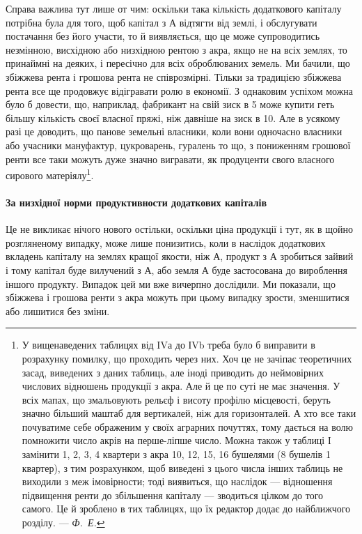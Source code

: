 Справа важлива тут лише от чим: оскільки така кількість додаткового
капіталу потрібна була для того, щоб капітал з $А$ відтягти від землі, і обслугувати
постачання без його участи, то й виявляється, що це може супроводитись
незмінною, висхідною або низхідною рентою з акра, якщо не на всіх землях, то
принаймні на деяких, і пересічно для всіх оброблюваних земель. Ми бачили, що
збіжжева рента і грошова рента не співрозмірні. Тільки за традицією збіжжева
рента все ще продовжує відігравати ролю в економії. З однаковим успіхом можна
було б довести, що, наприклад, фабрикант на свій зиск в 5 може купити
геть більшу кількість своєї власної пряжі, ніж давніше на зиск в 10.
Але в усякому разі це доводить, що панове земельні власники, коли вони одночасно
власники або учасники мануфактур, цукроварень, гуралень то що, з пониженням
грошової ренти все таки можуть дуже значно вигравати, як продуценти
свого власного сирового матеріялу\footnote{
У вищенаведених таблицях від IVа до ІVb треба було б виправити в розрахунку помилку, що
проходить через них. Хоч це не зачіпає теоретичних засад, виведених з даних таблиць, але іноді
приводить до неймовірних числових відношень продукції з акра. Але й це по суті не має значення. У
всіх мапах, що змальовують рельєф і висоту профілю місцевості, беруть значно більший маштаб для
вертикалей, ніж для горизонталей. А хто все таки почуватиме себе ображеним у своїх аграрних
почуттях, тому дається на волю помножити число акрів на перше-ліпше число. Можна також у таблиці І
замінити 1, 2, 3, 4 квартери з акра 10, 12, 15, 16 бушелями (8 бушелів \deq{} 1 квартер), з тим
розрахунком, щоб виведені з цього числа інших таблиць не виходили з меж імовірности; тоді виявиться,
що наслідок — відношення підвищення ренти до збільшення капіталу — зводиться цілком до того самого.
Це й зроблено в тих таблицях, що їх редактор додає до найближчого розділу. — \emph{ Ф.~Е.}
}.
\vspace{\bigskipamount}
\paragraph{За низхідної норми продуктивности додаткових капіталів}
\vspace{\medskipamount}

Це не викликає нічого нового остільки, оскільки ціна продукції і тут, як
в щойно розгляненому випадку, може лише понизитись, коли в наслідок додаткових
вкладень капіталу на землях кращої якости, ніж $А$, продукт з $А$ зробиться
зайвий і тому капітал буде вилучений з $А$, або земля $А$ буде застосована до вироблення
іншого продукту. Випадок цей ми вже вичерпно дослідили. Ми показали,
що збіжжева і грошова ренти з акра можуть при цьому випадку зрости,
зменшитися або лишитися без зміни.

